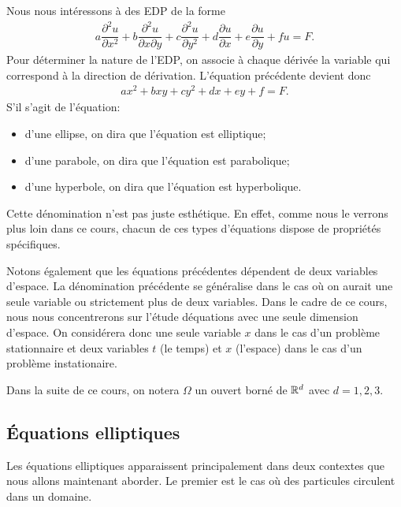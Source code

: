 \documentclass[12pt,a4paper,twoside]{article}
\begin{document}
Nous nous int\'eressons \`a des EDP de la forme
\begin{align*}
  a \dfrac{\partial^2 u}{\partial x^2} + b \dfrac{\partial^2 u}{\partial x \partial y}
  + c \dfrac{\partial^2 u}{\partial y^2} + d \dfrac{\partial u}{\partial x}
  + e \dfrac{\partial u}{\partial y} + f u = F .
\end{align*}
Pour d\'eterminer la nature de l'EDP, on associe \`a chaque d\'eriv\'ee
la variable qui correspond \`a la direction de d\'erivation.
L'\'equation pr\'ec\'edente devient donc
\begin{align*}
  a x^2 + b xy + c y^2 + d x + e y + f = F .
\end{align*}
S'il s'agit de l'\'equation:
\begin{itemize}
\item d'une ellipse, on dira que l'\'equation est elliptique;
\item d'une parabole, on dira que l'\'equation est parabolique;
\item d'une hyperbole, on dira que l'\'equation est hyperbolique.
\end{itemize}
Cette d\'enomination n'est pas juste esth\'etique.
En effet, comme nous le verrons plus loin dans ce cours,
chacun de ces types d'\'equations dispose de propri\'et\'es sp\'ecifiques.

Notons \'egalement que les \'equations pr\'ec\'edentes d\'ependent de deux
variables d'espace. La d\'enomination pr\'ec\'edente se g\'en\'eralise 
dans le cas o\`u on aurait une seule variable ou strictement plus de deux variables.
Dans le cadre de ce cours, nous nous concentrerons sur l'\'etude d\'equations
avec une seule dimension d'espace.
On consid\'erera donc une seule variable $x$ dans le cas d'un probl\`eme stationnaire
et deux variables $t$ (le temps) et $x$ (l'espace) dans le cas d'un probl\`eme
instationaire.

Dans la suite de ce cours, on notera $\Omega$ un ouvert born\'e de $\R^d$
avec $d=1,2,3$.

\subsection{\'Equations elliptiques}

Les \'equations elliptiques apparaissent principalement dans deux contextes que nous
allons maintenant aborder.
Le premier est le cas o\`u des particules circulent dans un domaine.

\begin{tikzpicture}[scale = 3]
  
\end{tikzpicture}
\begin{tikzpicture}[scale = 2.5]
  
\end{tikzpicture}
\end{document}
